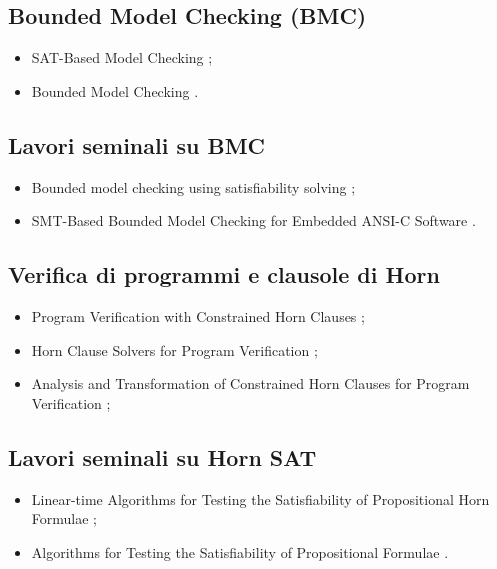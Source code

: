 \subsection*{Bounded Model Checking (BMC)}
\begin{itemize}

\item SAT-Based Model Checking \cite{biere2018satcheck};

\item Bounded Model Checking \cite{biere2021bmc}.

\end{itemize}

\subsection*{Lavori seminali su BMC}
\begin{itemize}

\item Bounded model checking using satisfiability solving \cite{clarke2001bmc};

\item SMT-Based Bounded Model Checking for Embedded ANSI-C Software \cite{cordeiro2009smtbmc}.

\end{itemize}

\subsection*{Verifica di programmi e clausole di Horn}
\begin{itemize}

\item Program Verification with Constrained Horn Clauses \cite{gurfinkel2022chc};

\item Horn Clause Solvers for Program Verification \cite{bjorner2015chc};

\item Analysis and Transformation of Constrained Horn Clauses for Program Verification \cite{deangelis2021chc};

\end{itemize}

\subsection*{Lavori seminali su Horn SAT}
\begin{itemize}

\item Linear-time Algorithms for Testing the Satisfiability of Propositional Horn Formulae \cite{dowling1984hornsat};

\item Algorithms for Testing the Satisfiability of Propositional Formulae \cite{gallo1989hornsat}.

\end{itemize}


